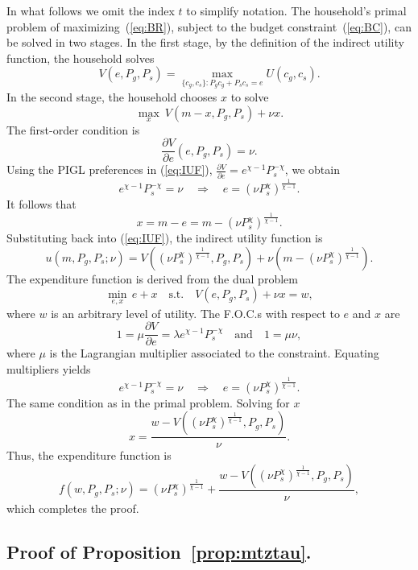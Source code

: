 \documentclass[12pt,a4paper]{article}
\begin{document}
\begin{appendices}
In what follows we omit the index $t$ to simplify notation. The household’s  primal problem of maximizing~(\ref{eq:BR}), subject to the budget constraint~(\ref{eq:BC}), can be solved in two stages. In the first stage, by the definition of the indirect utility function, the household solves
\[
V(e, P_g, P_s) = \max_{\{c_g, c_s\}: P_g c_g + P_s c_s = e} U(c_g, c_s).
\]
In the second stage, the household chooses \( x \) to solve
\[
\max_{x}\  V(m - x, P_g, P_s) + \nu x .
\]
The first-order condition is
\[
\frac{\partial V}{\partial e}(e, P_g, P_s) = \nu.
\]
Using the PIGL preferences in (\ref{eq:IUF}), \( \frac{\partial V}{\partial e} = e^{\chi - 1} P_s^{-\chi} \), we obtain
\[
e^{\chi - 1} P_s^{-\chi} = \nu \quad \Rightarrow \quad e = \left( \nu P_s^\chi \right)^{\frac{1}{\chi - 1}}.
\]
It follows that
\[
x = m - e = m - \left( \nu P_s^\chi \right)^{\frac{1}{\chi - 1}}.
\]
Substituting back into (\ref{eq:IUF}), the indirect utility function is
\[
u(m, P_g, P_s; \nu) =
V\left( \left( \nu P_s^\chi \right)^{\frac{1}{\chi - 1}}, P_g, P_s \right)
+ \nu \left( m - \left( \nu P_s^\chi \right)^{\frac{1}{\chi - 1}} \right).
\]
The expenditure function is derived from the dual problem
\[
\min_{e, x} \, e + x \quad \text{s.t.} \quad V(e, P_g, P_s) + \nu x = w ,
\]
where $w$ is an arbitrary level of utility. 
The F.O.C.s with respect to $e$ and $x$ are
\[
1 = \mu \frac{\partial V}{\partial e} = \lambda e^{\chi - 1} P_s^{-\chi}
\quad\text{and}\quad
1 = \mu \nu ,
\]
where $\mu$ is the Lagrangian multiplier associated to the constraint.
Equating multipliers yields
\[
e^{\chi - 1} P_s^{-\chi} = \nu \quad \Rightarrow \quad e = \left( \nu P_s^\chi \right)^{\frac{1}{\chi - 1}}.
\]
The same condition as in the primal problem.
Solving for \( x \)
\[
x = \frac{w - V\left( \left( \nu P_s^\chi \right)^{\frac{1}{\chi - 1}}, P_g, P_s \right)}{\nu}.
\]
Thus, the expenditure function is
\[
f(w, P_g, P_s; \nu) = \left( \nu P_s^\chi \right)^{\frac{1}{\chi - 1}}
+ \frac{w - V\left( \left( \nu P_s^\chi \right)^{\frac{1}{\chi - 1}}, P_g, P_s \right)}{\nu},
\]
which completes the proof. \qedsymbol


\subsection{Proof of Proposition~\ref{prop:mtztau}.} \label{app:mtztau}


\end{appendices}
\end{document}
